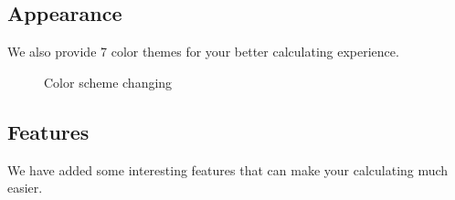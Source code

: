 \documentclass[a5paper, 10pt]{article}
\begin{document}
    \subsection{Appearance}
        We also provide 7 color themes for your better calculating experience.
        \begin{figure}[h]
            \centering
            \caption{Color scheme changing}
            \label{fig:UI_Main_Window_02}
        \end{figure}

    \subsection{Features}
        We have added some interesting features that can make your calculating much easier.
        \pagebreak
\end{document}
